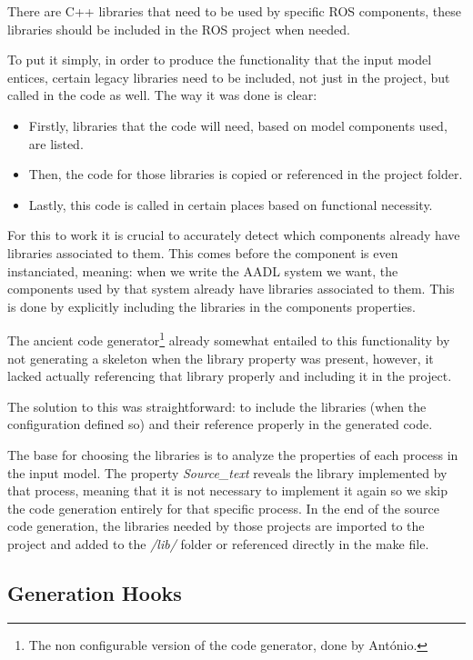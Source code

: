 There are C++ libraries that need to be used by specific \gls{ROS} components, these libraries should be included in the \gls{ROS} project when needed.

To put it simply, in order to produce the functionality that the input model entices, certain legacy libraries need to be included, not just in the project, but called in the code as well. The way it was done is clear:

\begin{itemize} 
	\item Firstly, libraries that the code will need, based on model components used, are listed.
	\item Then, the code for those libraries is copied or referenced in the project folder.
	\item Lastly, this code is called in certain places based on functional necessity.
\end{itemize}

For this to work it is crucial to accurately detect which components already have libraries associated to them. This comes before the component is even instanciated, meaning: when we write the \gls{AADL} system we want, the components used by that system already have libraries associated to them. This is done by explicitly including the libraries in the components properties.

The ancient code generator\footnote{The non configurable version of the code generator, done by António.} already somewhat entailed to this functionality by not generating a skeleton when the library property was present, however, it lacked actually referencing that library properly and including it in the project.

The solution to this was straightforward: to include the libraries (when the configuration defined so) and their reference properly in the generated code.

The base for choosing the libraries is to analyze the properties of each process in the input model. The property \textit{Source\_text} reveals the library implemented by that process, meaning that it is not necessary to implement it again so we skip the code generation entirely for that specific process. In the end of the source code generation, the libraries needed by those projects are imported to the project and added to the \textit{/lib/} folder or referenced directly in the make file.

\subsection{Generation Hooks}
\label{sec:impl_gen_hooks}


